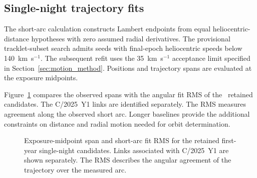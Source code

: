 \subsection{Single-night trajectory fits}
\label{app:shortarc}

The short-arc calculation constructs Lambert endpoints from
equal heliocentric-distance hypotheses with zero assumed radial
derivatives. The provisional tracklet-subset search admits seeds
with final-epoch heliocentric speeds below 140~km~s$^{-1}$.
The subsequent refit uses the 35~km~s$^{-1}$ acceptance limit
specified in Section~\ref{sec:motion_method}. Positions and
trajectory spans are evaluated at the exposure midpoints.

Figure~\ref{fig:shortarc} compares the observed spans with the
angular fit RMS of the \yrNCandidates\ retained candidates.
The C/2025~Y1 links are identified separately. The RMS measures
agreement along the observed short arc. Longer baselines
provide the additional constraints on distance and radial
motion needed for orbit determination.

\begin{figure}[htbp]
\centering
{}
\caption{Exposure-midpoint span and short-arc fit RMS for the
retained first-year single-night candidates. Links associated
with C/2025~Y1 are shown separately. The RMS describes the
angular agreement of the trajectory over the measured arc.}
\label{fig:shortarc}
\end{figure}
